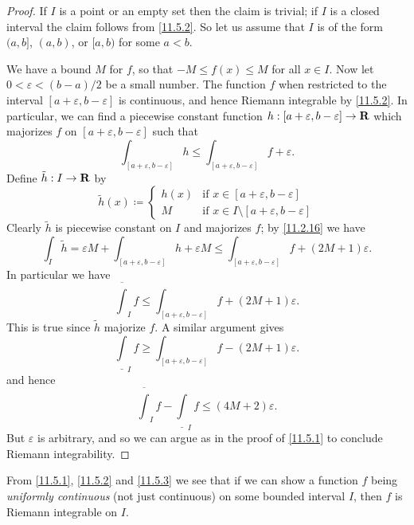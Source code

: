 \begin{proof}
  If \(I\) is a point or an empty set then the claim is trivial;
  if \(I\) is a closed interval the claim follows from \cref{11.5.2}.
  So let us assume that \(I\) is of the form \((a, b]\), \((a, b)\), or \([a, b)\) for some \(a < b\).

  We have a bound \(M\) for \(f\), so that \(-M \leq f(x) \leq M\) for all \(x \in I\).
  Now let \(0 < \varepsilon < (b - a) / 2\) be a small number.
  The function \(f\) when restricted to the interval \([a + \varepsilon, b - \varepsilon]\) is continuous, and hence Riemann integrable by \cref{11.5.2}.
  In particular, we can find a piecewise constant function \(h : [a + \varepsilon, b - \varepsilon] \to \mathbf{R}\) which majorizes \(f\) on \([a + \varepsilon, b - \varepsilon]\) such that
  \[
    \int_{[a + \varepsilon, b - \varepsilon]} h \leq \int_{[a + \varepsilon, b - \varepsilon]} f + \varepsilon.
  \]
  Define \(\tilde{h} : I \to \mathbf{R}\) by
  \[
    \tilde{h}(x) \coloneqq \begin{cases}
      h(x) & \text{if } x \in [a + \varepsilon, b - \varepsilon]             \\
      M    & \text{if } x \in I \setminus [a + \varepsilon, b - \varepsilon]
    \end{cases}
  \]
  Clearly \(\tilde{h}\) is piecewise constant on \(I\) and majorizes \(f\);
  by \cref{11.2.16} we have
  \[
    \int_I \tilde{h} = \varepsilon M + \int_{[a + \varepsilon, b - \varepsilon]} h + \varepsilon M \leq \int_{[a + \varepsilon, b - \varepsilon]} f + (2M + 1) \varepsilon.
  \]
  In particular we have
  \[
    \overline{\int}_I f \leq \int_{[a + \varepsilon, b - \varepsilon]} f + (2M + 1) \varepsilon.
  \]
  This is true since \(\tilde{h}\) majorize \(f\).
  A similar argument gives
  \[
    \underline{\int}_I f \geq \int_{[a + \varepsilon, b - \varepsilon]} f - (2M + 1) \varepsilon.
  \]
  and hence
  \[
    \overline{\int}_I f - \underline{\int}_I f \leq (4M + 2) \varepsilon.
  \]
  But \(\varepsilon\) is arbitrary, and so we can argue as in the proof of \cref{11.5.1} to conclude Riemann integrability.
\end{proof}

\begin{note}
  From \cref{11.5.1}, \cref{11.5.2} and \cref{11.5.3} we see that if we can show a function \(f\) being \emph{uniformly continuous} (not just continuous) on some bounded interval \(I\), then \(f\) is Riemann integrable on \(I\).
\end{note}

